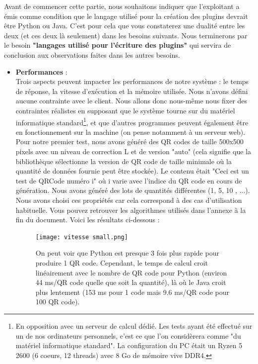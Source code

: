 \documentclass[a4paper,12pt]{article}
\begin{document}
\noindent Avant de commencer cette partie, nous souhaitons indiquer que l'exploitant a émis comme condition que le langage utilisé pour la création des plugins devrait être Python ou Java. C'est pour cela que vous constaterez une dualité entre les deux (et ces deux là seulement) dans les besoins suivants. Nous terminerons par le besoin \textbf{"langages utilisé pour l'écriture des plugins"} qui servira de conclusion aux observations faites dans les autres besoins.\\

\begin{itemize}
  
  \item \textbf{Performances} :\\
  \label{performances}
  Trois aspects peuvent impacter les performances de notre système : le temps de réponse, la vitesse d'exécution et la mémoire utilisée. Nous n'avons défini aucune contrainte avec le client. Nous allons donc nous-même nous fixer des contraintes réalistes en supposant que le système tourne sur du matériel informatique standard\footnote{En opposition avec un serveur de calcul dédié. Les tests ayant été effectué sur un de nos ordinateurs personnels, c'est ce que l'on considèrera comme "du matériel informatique standard". La configuration du PC était un Ryzen 5 2600 (6 coeurs, 12 threads) avec 8 Go de mémoire vive DDR4.}, et que d'autres programmes peuvent également être en fonctionnement sur la machine (on pense notamment à un serveur web).\\
  
  Pour notre premier test, nous avons généré des QR codes de taille 500x500 pixels avec un niveau de correction L et de version "auto" (cela signifie que la bibliothèque sélectionne la version de QR code de taille minimale où la quantité de données fournie peut être stockée). Le contenu était "Ceci est un test de QRCode numéro i" où i varie avec l'indice du QR code en cours de génération. Nous avons généré des lots de quantités différentes (1, 5, 10 , ...). Nous avons choisi ces propriétés car cela correspond à des cas d'utilisation habituelle. Vous pouvez retrouver les algorithmes utilisés dans l'annexe à la fin du document. Voici les résultats ci-dessous :

    \begin{figure}[H]
        \centering
        \texttt{[image: vitesse small.png]}
        \caption{On peut voir que Python est presque 3 fois plus rapide pour produire 1 QR code. Cependant, le temps de calcul croit linéairement avec le nombre de QR code pour Python (environ 44 ms/QR code quelle que soit la quantité), là où le Java croit plus lentement (153 ms pour 1 code mais 9.6 ms/QR code pour 100 QR code).}
    \end{figure}
 

\end{itemize}
\end{document}
